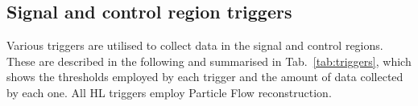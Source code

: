 
\subsection{Signal and control region triggers}

Various triggers are utilised to collect data in the signal and control 
regions. These are described in the following and summarised in 
Tab.~\ref{tab:triggers}, which shows the thresholds employed by each trigger 
and the amount of data collected by each one. All HL triggers employ Particle 
Flow reconstruction.

